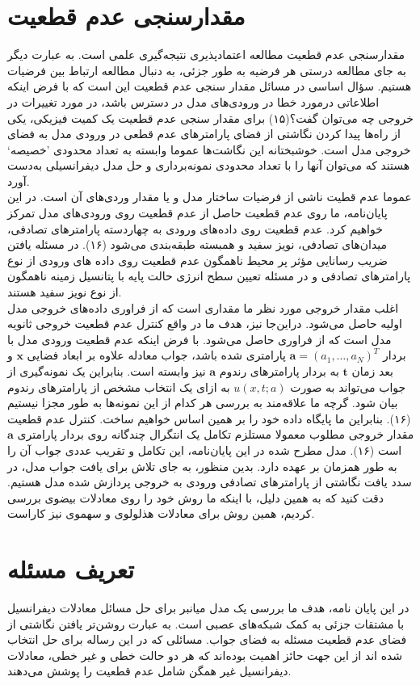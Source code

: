 \section*{مقدارسنجی عدم قطعیت }
مقدارسنجی عدم قطعیت مطالعه اعتمادپذیری نتیجه‌گیری علمی است. به عبارت دیگر به جای مطالعه درستی هر فرضیه به طور جزئی، به دنبال  مطالعه ارتباط بین فرضیات هستیم. سؤال اساسی در مسائل مقدار سنجی عدم قطعیت این است که با فرض اینکه اطلاعاتی درمورد خطا در ورودی‌های مدل در دسترس باشد، در مورد تغییرات در خروجی چه می‌توان گفت؟(۱۵) برای مقدار سنجی عدم قطعیت یک کمیت فیزیکی، یکی از راه‌ها پیدا کردن نگاشتی از فضای پارامترهای عدم قطعی در ورودی مدل به فضای خروجی مدل است. خوشبختانه این نگاشت‌ها عموما وابسته به تعداد محدودی 'خصیصه` هستند که می‌توان آنها را با تعداد محدودی نمونه‌برداری و حل مدل دیفرانسیلی به‌دست آورد.\\
عموما عدم قطیت ناشی از فرضیات ساختار مدل و یا مقدار وردی‌های آن است. در این پایان‌نامه، ما روی عدم قطعیت حاصل از عدم قطعیت روی ورودی‌های مدل تمرکز خواهیم کرد. عدم قطعیت روی داده‌های ورودی به چهاردسته پارامترهای تصادفی، میدان‌های تصادفی، نویز سفید و همبسته طبقه‌بندی می‌شود (۱۶). در مسئله یافتن ضریب رسانایی مؤثر پر محیط ناهمگون عدم قطعیت روی داده های ورودی از نوع پارامترهای تصادفی و در مسئله تعیین سطح انرژی حالت پایه با پتانسیل زمینه ناهمگون از نوع نویز سفید هستند. \\
اغلب مقدار خروجی مورد نظر ما مقداری است که از فراوری‌ داده‌های خروجی مدل اولیه حاصل می‌شود. دراین‌جا نیز، هدف ما در واقع کنترل عدم قطعیت خروجی ثانویه مدل است که از فراوری حاصل می‌شود. با فرض اینکه عدم قطعیت ورودی مدل با بردار $\bm{a}=(a_1,\dots,a_N)^T$ پارامتری شده باشد، جواب معادله علاوه بر ابعاد فضایی $\bm{x}$ و بعد زمان $\bm{t}$ به بردار پارامترهای رندوم $\bm{a}$ نیز وابسته است. بنابراین یک نمونه‌گیری از جواب می‌تواند به صورت $u(x,t;a)$ به ازای یک انتخاب مشخص از پارامترهای رندوم بیان شود. گرچه ما علاقه‌‌مند به بررسی هر کدام از این نمونه‌ها به طور مجزا نیستیم (۱۶). بنابراین ما پایگاه داده خود را بر همین اساس خواهیم ساخت. کنترل عدم قطعیت مقدار خروجی مطلوب معمولا مستلزم تکامل یک انتگرال چندگانه روی بردار پارامتری $\bm{a}$ است (۱۶). مدل مطرح شده در این پایان‌نامه، این تکامل و تقریب عددی جواب آن را به طور همزمان بر عهده دارد. بدین منظور، به جای تلاش برای یافت جواب مدل، در سدد یافت نگاشتی از پارامترهای تصادفی ورودی به خروجی پردازش شده مدل هستیم. دقت کنید که به همین دلیل، با اینکه ما روش خود را روی معادلات بیضوی بررسی کردیم، همین روش برای معادلات هذلولوی و سهموی نیز کاراست.
\section*{تعریف مسئله }
در این پایان نامه، هدف ما بررسی یک مدل میانبر برای حل مسائل معادلات دیفرانسیل با مشتقات جزئی به کمک شبکه‌های عصبی است. به عبارت روشن‌تر یافتن نگاشتی از فضای عدم قطعیت مسئله به فضای جواب. مسائلی که در این رساله برای حل انتخاب شده اند از این جهت حائز اهمیت بوده‌اند که هر دو حالت خطی و غیر خطی، معادلات دیفرانسیل غیر همگن شامل عدم قطعیت را پوشش می‌دهند.

